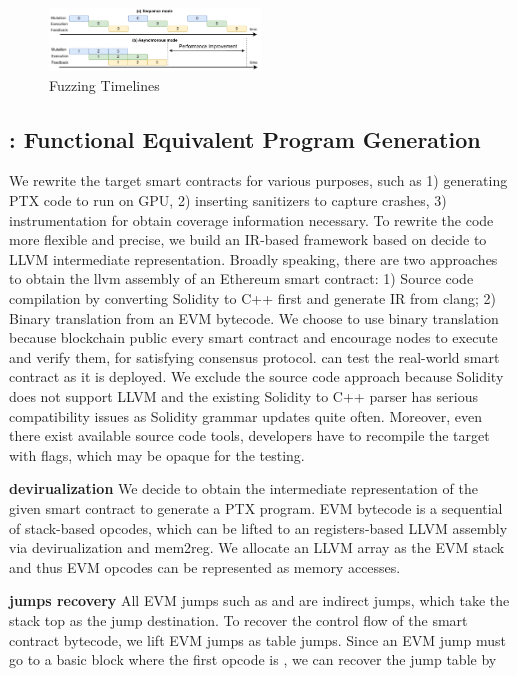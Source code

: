 \begin{figure}[t]
\centerline{\includegraphics[width=0.5\textwidth]{images/GFL-async_cpy.drawio.pdf}}
\caption{Fuzzing Timelines}
\vspace{-0.1in}
\label{fig:async_cpy}
\end{figure}
    
\subsection{{\translator}: Functional Equivalent Program Generation}

We rewrite the target smart contracts for various purposes, such as 1) generating PTX code to run on GPU, 2) inserting sanitizers to capture crashes, 3) instrumentation for obtain coverage information necessary. 
To rewrite the code more flexible and precise, we build an IR-based framework based on decide to LLVM intermediate representation.
%
Broadly speaking, there are two approaches to obtain the llvm assembly of an Ethereum smart contract: 1) Source code compilation by converting Solidity to C++ first and generate IR from clang\cite{}; 2) Binary translation from an EVM bytecode. 
We choose to use binary translation because blockchain public every smart contract and encourage nodes to execute and verify them, for satisfying consensus protocol. {\tool} can test the real-world smart contract as it is deployed. 
We exclude the source code approach because Solidity does not support LLVM and the existing Solidity to C++ parser has serious compatibility issues as Solidity grammar updates quite often. Moreover, even there exist available source code tools, developers have to recompile the target with flags, which may be opaque for the testing. 


\noindent \textbf{devirualization}
We decide to obtain the intermediate representation of the given smart contract to generate a PTX program. 
EVM bytecode is a sequential of stack-based opcodes, which can be lifted to an registers-based LLVM assembly via devirualization and mem2reg\cite{}. 
We allocate an LLVM array as the EVM stack and thus EVM opcodes can be represented as memory accesses. 

\noindent \textbf{jumps recovery}
All EVM jumps such as  and  are indirect jumps, which take the stack top as the jump destination. 
To recover the control flow of the smart contract bytecode, we lift EVM jumps as table jumps. 
Since an EVM jump must go to a basic block where the first opcode is , we can recover the jump table by 

